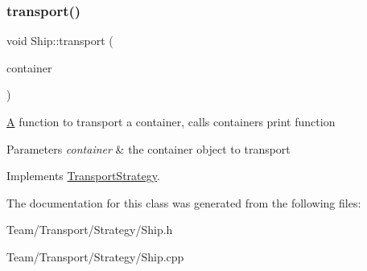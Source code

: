 \subsubsection{\texorpdfstring{transport()}{transport()}}
{\footnotesize\ttfamily void Ship\+::transport (\begin{DoxyParamCaption}\item[{\hyperlink{classContainer}{Container} $\ast$}]{container }\end{DoxyParamCaption})\hspace{0.3cm}{\ttfamily [virtual]}}

\hyperlink{classA}{A} function to transport a container, calls containers print function 
\begin{DoxyParams}{Parameters}
{\em container} & the container object to transport \\
\hline
\end{DoxyParams}


Implements \hyperlink{classTransportStrategy_ab5659f9d5d352ba0a23f1e99edd3d488}{Transport\+Strategy}.



The documentation for this class was generated from the following files\+:\begin{DoxyCompactItemize}
\item 
Team/\+Transport/\+Strategy/Ship.\+h\item 
Team/\+Transport/\+Strategy/Ship.\+cpp\end{DoxyCompactItemize}
